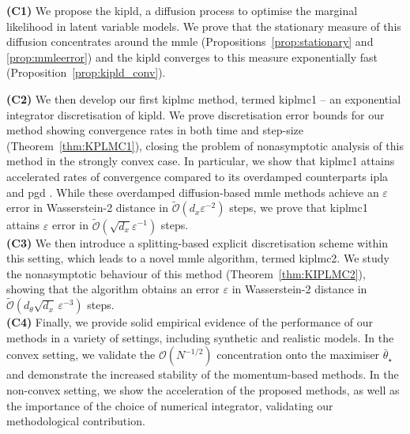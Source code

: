 \noindent\textbf{(C1)} We propose the \gls*{kipld}, a diffusion process to optimise the marginal likelihood in latent variable models. We prove that the stationary measure of this diffusion concentrates around the \gls*{mmle} (Propositions~\ref{prop:stationary} and \ref{prop:mmleerror}) and the \gls*{kipld} converges to this measure exponentially fast (Proposition~\ref{prop:kipld_conv}). \\

\noindent\textbf{(C2)} We then develop our first \gls*{kiplmc} method, termed \gls*{kiplmc1} -- an exponential integrator discretisation of \gls*{kipld}. We prove discretisation error bounds for our method showing convergence rates in both time and step-size (Theorem~\ref{thm:KPLMC1}), closing the problem of nonasymptotic analysis of this method in the strongly convex case. In particular, we show that \gls*{kiplmc1} attains accelerated rates of convergence compared to its overdamped counterparts \gls*{ipla} \citep{akyildiz2025interacting} and \gls*{pgd} \citep{caprio2024error}. While these overdamped diffusion-based \gls*{mmle} methods achieve an $\varepsilon$ error in Wasserstein-2 distance in $\widetilde{\mathcal{O}}(d_x \varepsilon^{-2})$ steps, we prove that \gls*{kiplmc1} attains $\varepsilon$ error in $\widetilde{\mathcal{O}}(\sqrt{d_x} \varepsilon^{-1})$ steps.\\

\noindent\textbf{(C3)} We then introduce a splitting-based explicit discretisation scheme within this setting, which leads to a novel \gls*{mmle} algorithm, termed \gls*{kiplmc2}. We study the nonasymptotic behaviour of this method (Theorem~\ref{thm:KIPLMC2}), showing that the algorithm obtains an error $\varepsilon$ in Wasserstein-2 distance in $\widetilde{\mathcal{O}}(d_\theta\sqrt{d_x}\,\varepsilon^{-3})$ steps.\\

\noindent\textbf{(C4)} Finally, we provide solid empirical evidence of the performance of our methods in a variety of settings, including synthetic and realistic models. In the convex setting, we validate the $\mathcal{O}(N^{-1/2})$ concentration onto the maximiser $\bar{\theta}_\star$  and demonstrate the increased stability of the momentum-based methods. In the non-convex setting, we show the acceleration of the proposed methods, as well as the importance of the choice of numerical integrator, validating our methodological contribution. \\

